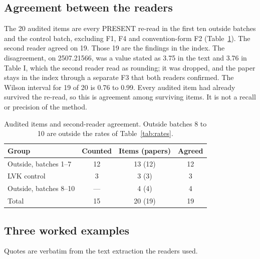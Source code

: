 \documentclass[reprint,amsmath,amssymb,aps,superscriptaddress,nofootinbib]{revtex4-2}
\begin{document}
\subsection{Agreement between the readers}

The 20 audited items are every PRESENT re-read in the first ten outside batches and the control batch, excluding F1, F4 and convention-form F2 (Table~\ref{tab:agree}). The second reader agreed on 19. Those 19 are the findings in the index. The disagreement, on 2507.21566, was a value stated as 3.75 in the text and 3.76 in Table I, which the second reader read as rounding; it was dropped, and the paper stays in the index through a separate F3 that both readers confirmed. The Wilson interval for 19 of 20 is 0.76 to 0.99. Every audited item had already survived the re-read, so this is agreement among surviving items. It is not a recall or precision of the method.

\begin{table}[t]
\caption{Audited items and second-reader agreement. Outside batches 8 to 10 are outside the rates of Table~\ref{tab:rates}.}
\label{tab:agree}
\centering\small
\begin{tabular}{lccc}
\hline\hline
Group & Counted & Items (papers) & Agreed \\ \hline
Outside, batches 1--7 & 12 & 13 (12) & 12 \\
LVK control & 3 & 3 (3) & 3 \\
Outside, batches 8--10 & --- & 4 (4) & 4 \\
Total & 15 & 20 (19) & 19 \\
\hline\hline
\end{tabular}
\end{table}

\subsection{Three worked examples}
\label{sec:examples}

Quotes are verbatim from the text extraction the readers used.
\end{document}
